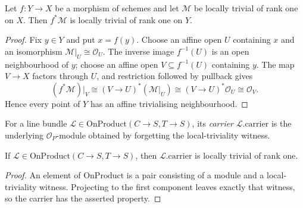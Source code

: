 \begin{lemma}\label{mk-lem:IsLocallyTrivial_pullback}
  \leanok

  Let $f:Y\to X$ be a morphism of schemes and let $\mathcal M$ be locally
  trivial of rank one on $X$.  Then $f^*\mathcal M$ is locally trivial of rank
  one on $Y$.
\end{lemma}
\begin{proof}
  \leanok
  Fix $y\in Y$ and put $x=f(y)$.  Choose an affine open $U$ containing $x$
  and an isomorphism $\mathcal M|_U\cong\mathcal O_U$.  The inverse image
  $f^{-1}(U)$ is an open neighbourhood of $y$; choose an affine open
  $V\subseteq f^{-1}(U)$ containing $y$.  The map $V\to X$ factors through
  $U$, and restriction followed by pullback gives
  \[
    (f^*\mathcal M)|_V
      \cong (V\to U)^*(\mathcal M|_U)
      \cong (V\to U)^*\mathcal O_U
      \cong \mathcal O_V.
  \]
  Hence every point of $Y$ has an affine trivialising neighbourhood.
\end{proof}
\begin{definition}\label{mk-def:OnProduct_carrier}
  \leanok

  For a line bundle $\mathcal L\in\mathrm{OnProduct}(C\to S,T\to S)$, its
  \emph{carrier} $\mathcal L.\mathrm{carrier}$ is the underlying
  $\mathcal O_P$-module obtained by forgetting the local-triviality witness.
\end{definition}

\begin{lemma}\label{mk-lem:OnProduct_isLocallyTrivial}
  \leanok

  If $\mathcal L\in\mathrm{OnProduct}(C\to S,T\to S)$, then
  $\mathcal L.\mathrm{carrier}$ is locally trivial of rank one.
\end{lemma}
\begin{proof}
  \leanok
  An element of $\mathrm{OnProduct}$ is a pair consisting of a module and a
  local-triviality witness.  Projecting to the first component leaves exactly
  that witness, so the carrier has the asserted property.
\end{proof}

